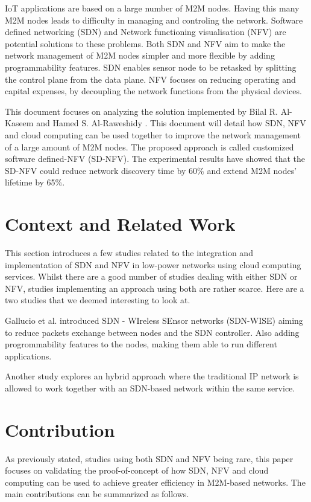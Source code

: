 \documentclass[10pt,journal,compsoc]{IEEEtran}
\begin{document}
IoT applications are based on a large number of M2M nodes. 
Having this many M2M nodes leads to difficulty in 
managing and controling the network. Software defined networking (SDN) 
and Network functioning visualisation (NFV) are potential solutions to 
these problems. Both SDN and NFV aim to make the network management 
of M2M nodes simpler and more flexible by adding programmability features. 
SDN enables sensor node to be retasked by splitting the control plane from 
the data plane. NFV focuses on reducing operating and capital expenses, 
by decoupling the network functions from the physical devices. 

This document focuses on analyzing the solution implemented by Bilal 
R. Al-Kaseem and Hamed S. Al-Raweshidy \cite{main}. 
This document will detail how SDN, NFV and cloud computing can be used 
together to improve the network management of a large amount of M2M nodes. 
The proposed approach is called customized software defined-NFV (SD-NFV). 
The experimental results have showed that the SD-NFV could reduce 
network discovery time by 60\% and extend M2M nodes' lifetime by 65\%.

\section{Context and Related Work}\label{sec:context}

This section introduces a few studies related to the integration and 
implementation of SDN and NFV in low-power networks using cloud 
computing services. Whilst there are a good number of studies dealing with 
either SDN or NFV, studies implementing an approach using both are 
rather scarce. Here are a two studies that we deemed interesting to look 
at. 

Gallucio et al. \cite{sdn-wise} introduced SDN - WIreless SEnsor 
networks (SDN-WISE) aiming to reduce packets exchange between nodes and 
the SDN controller. Also adding progrommability features to the nodes, 
making them able to run different applications. 

Another study \cite{hybrid} explores an hybrid approach where the 
traditional IP network is allowed to work together with an SDN-based 
network within the same service. 

\section{Contribution}\label{sec:contribution}

As previously stated, studies using both SDN and NFV being rare, this paper 
focuses on validating the proof-of-concept of how SDN, NFV and cloud 
computing can be used to achieve greater efficiency in M2M-based networks.
The main contributions can be summarized as follows.
\end{document}
